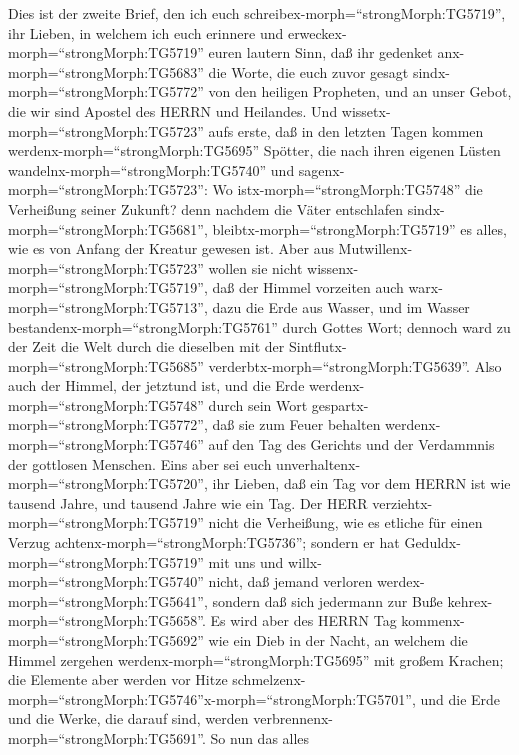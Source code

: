  Dies ist der zweite Brief, den ich euch
schreibex-morph=``strongMorph:TG5719'', ihr Lieben, in welchem ich euch
erinnere und erweckex-morph=``strongMorph:TG5719'' euren lautern Sinn,
 daß ihr gedenket anx-morph=``strongMorph:TG5683'' die
Worte, die euch zuvor gesagt sindx-morph=``strongMorph:TG5772'' von den
heiligen Propheten, und an unser Gebot, die wir sind Apostel des HERRN
und Heilandes.  Und wissetx-morph=``strongMorph:TG5723''
aufs erste, daß in den letzten Tagen kommen
werdenx-morph=``strongMorph:TG5695'' Spötter, die nach ihren eigenen
Lüsten wandelnx-morph=``strongMorph:TG5740''  und
sagenx-morph=``strongMorph:TG5723'': Wo
istx-morph=``strongMorph:TG5748'' die Verheißung seiner Zukunft? denn
nachdem die Väter entschlafen sindx-morph=``strongMorph:TG5681'',
bleibtx-morph=``strongMorph:TG5719'' es alles, wie es von Anfang der
Kreatur gewesen ist.  Aber aus
Mutwillenx-morph=``strongMorph:TG5723'' wollen sie nicht
wissenx-morph=``strongMorph:TG5719'', daß der Himmel vorzeiten auch
warx-morph=``strongMorph:TG5713'', dazu die Erde aus Wasser, und im
Wasser bestandenx-morph=``strongMorph:TG5761'' durch Gottes Wort;
 dennoch ward zu der Zeit die Welt durch die dieselben mit
der Sintflutx-morph=``strongMorph:TG5685''
verderbtx-morph=``strongMorph:TG5639''.  Also auch der
Himmel, der jetztund ist, und die Erde
werdenx-morph=``strongMorph:TG5748'' durch sein Wort
gespartx-morph=``strongMorph:TG5772'', daß sie zum Feuer behalten
werdenx-morph=``strongMorph:TG5746'' auf den Tag des Gerichts und der
Verdammnis der gottlosen Menschen.  Eins aber sei euch
unverhaltenx-morph=``strongMorph:TG5720'', ihr Lieben, daß ein Tag vor
dem HERRN ist wie tausend Jahre, und tausend Jahre wie ein Tag.
 Der HERR verziehtx-morph=``strongMorph:TG5719'' nicht die
Verheißung, wie es etliche für einen Verzug
achtenx-morph=``strongMorph:TG5736''; sondern er hat
Geduldx-morph=``strongMorph:TG5719'' mit uns und
willx-morph=``strongMorph:TG5740'' nicht, daß jemand verloren
werdex-morph=``strongMorph:TG5641'', sondern daß sich jedermann zur Buße
kehrex-morph=``strongMorph:TG5658''.  Es wird aber des
HERRN Tag kommenx-morph=``strongMorph:TG5692'' wie ein Dieb in der
Nacht, an welchem die Himmel zergehen
werdenx-morph=``strongMorph:TG5695'' mit großem Krachen; die Elemente
aber werden vor Hitze
schmelzenx-morph=``strongMorph:TG5746''x-morph=``strongMorph:TG5701'',
und die Erde und die Werke, die darauf sind, werden
verbrennenx-morph=``strongMorph:TG5691''.  So nun das alles
